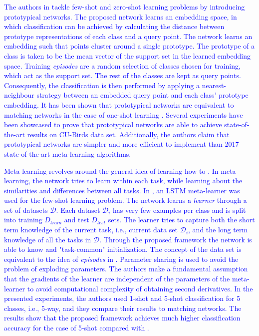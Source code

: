 \documentclass[a4paper,11pt]{article}
\begin{document}
\textcolor{blue}{The authors in \cite{snell2017prototypical} tackle few-shot and zero-shot learning problems by introducing prototypical networks. The proposed network learns an embedding space, in which classification can be achieved by calculating the distance between prototype representations of each class and a query point. The network learns an embedding such that points cluster around a single prototype. The prototype of a class is taken to be the mean vector of the support set in the learned embedding space. Training \textit{episodes} are a random selection of classes chosen for training, which act as the support set. The rest of the classes are kept as query points. Consequently, the classification is then performed by applying a nearest-neighbour strategy between an embedded query point and each class' prototype embedding. It has been shown that prototypical networks are equivalent to matching networks in the case of one-shot learning \cite{snell2017prototypical}. Several experiments have been showcased to prove that prototypical networks are able to achieve state-of-the-art results on CU-Birds data set. Additionally, the authors claim that prototypical networks are simpler and more efficient to implement than 2017 state-of-the-art meta-learning algorithms.}

\textcolor{blue}{Meta-learning revolves around the general idea of learning how to . In meta-learning, the network tries to learn within each task, while learning about the similarities and differences between all tasks. In \cite{ravi2016optimization}, an LSTM meta-learner was used for the few-shot learning problem. The network learns a \textit{learner} through a set of datasets $\mathcal{D}$. Each dataset $\mathcal{D}_i$ has very few examples per class and is split into training $D_{train}$ and test $D_{test}$ sets. The learner tries to capture both the short term knowledge of the current task, i.e., current data set $\mathcal{D}_i$, and the long term knowledge of all the tasks in $\mathcal{D}$. Through the proposed framework the network is able to know and "task-common" initialization. The concept of the data set is equivalent to the idea of \textit{episodes} in \cite{vinyals2016matching,snell2017prototypical}. Parameter sharing is used to avoid the problem of exploding parameters. The authors make a fundamental assumption that the gradients of the learner are independent of the parameters of the meta-learner to avoid computational complexity of obtaining second derivatives. In the presented experiments, the authors used 1-shot and 5-shot classification for 5 classes, i.e., $5$-way, and they compare their results to matching networks. The results show that the proposed framework achieves much higher classification accuracy for the case of 5-shot compared with \cite{vinyals2016matching}.}
\end{document}
